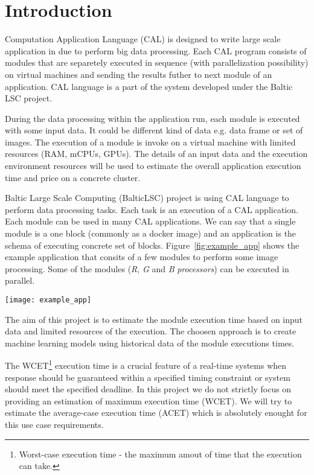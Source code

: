 \section{Introduction}

Computation Application Language (CAL) is designed to write large scale application in due to perform big data processing. Each CAL program consists of modules that are separetely executed in sequence (with parallelization possibility) on virtual machines and sending the results futher to next module of an application. CAL language is a part of the system developed under the Baltic LSC\cite{baltic_lsc_website} project.

During the data processing within the application run, each module is executed with some input data. It could be different kind of data e.g. data frame or set of images. The execution of a module is invoke on a virtual machine with limited resources (RAM, mCPUs, GPUs). The details of an input data and the execution environment resources will be used to estimate the overall application execution time and price on a concrete cluster.

Baltic Large Scale Computing (BalticLSC\cite{baltic_lsc}) project is using CAL language to perform data processing tasks. Each task is an execution of a CAL application. Each module can be used in many CAL applications. We can say that a single module is a one block (commonly as a docker image) and an application is the schema of executing concrete set of blocks. Figure~\ref{fig:example_app} shows the example application that consits of a few modules to perform some image processing. Some of the modules (\textit{R}, \textit{G} and \textit{B} \textit{processors}) can be executed in parallel.

\begin{figure*}[!t]
	\centering
	\begin{minipage}{0.9\linewidth}
	\texttt{[image: example\_app]}
	\end{minipage}
	\caption{The example of an image processing application written in the CAL language.}
	\label{fig:example_app}
\end{figure*}

The aim of this project is to estimate the module execution time based on input data and limited resources of the execution. The choosen approach is to create machine learning models using historical data of the module executions times.

The WCET\footnote{Worst-case execution time - the maximum amout of time that the execution can take.} execution time is a crucial feature of a real-time systems\cite{wcet} when response should be guaranteed within a specified timing constraint or system should meet the specified deadline. In this project we do not strictly focus on providing an estimation of maximum execution time (WCET). We will try to estimate the average-case execution time (ACET) which is absolutely enought for this use case requirements.